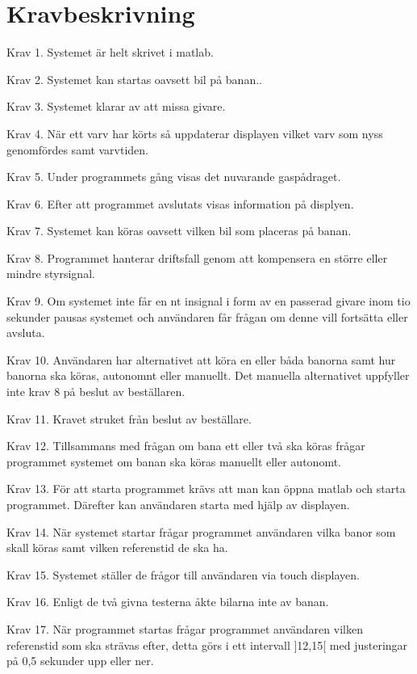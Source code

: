 \section{Kravbeskrivning}

Krav 1. Systemet är helt skrivet i matlab.

Krav 2. Systemet kan startas oavsett bil på banan.. 

Krav 3. Systemet klarar av att missa givare. 

Krav 4. När ett varv har körts så uppdaterar displayen vilket varv som nyss
genomfördes samt varvtiden. 

Krav 5. Under programmets gång visas det nuvarande gaspådraget. 

Krav 6. Efter att programmet avslutats visas information på displyen.

Krav 7. Systemet kan köras oavsett vilken bil som placeras på banan. 

Krav 8. Programmet hanterar driftsfall genom att kompensera en större eller
mindre styrsignal. 

Krav 9. Om systemet inte får en nt insignal i form av en passerad givare inom
tio sekunder pausas systemet och användaren får frågan om denne vill fortsätta
eller avsluta. 

Krav 10. Användaren har alternativet att köra en eller båda banorna samt hur
banorna ska köras, autonomnt eller manuellt. Det manuella alternativet uppfyller
inte krav 8 på beslut av beställaren. 

Krav 11. Kravet struket från beslut av beställare. 

Krav 12. Tillsammans med frågan om bana ett eller två ska köras frågar
programmet systemet om banan ska köras manuellt eller autonomt. 

Krav 13. För att starta programmet krävs att man kan öppna matlab och starta
programmet. Därefter kan användaren starta med hjälp av displayen.  
 
Krav 14. När systemet startar frågar programmet användaren vilka banor som skall
köras samt vilken referenstid de ska ha. 

Krav 15. Systemet ställer de frågor till användaren via touch displayen.

Krav 16. Enligt de två givna testerna åkte bilarna inte av banan.

Krav 17. När programmet startas frågar programmet användaren vilken referenstid
som ska strävas efter, detta görs i ett intervall ]12,15[ med justeringar på 0,5
sekunder upp eller ner. 

